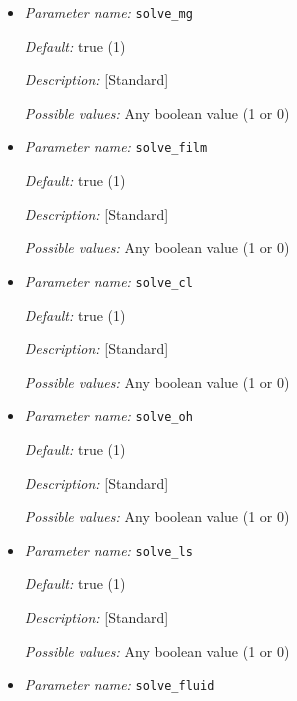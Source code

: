 \begin{itemize}
\item {\it Parameter name:} {\tt solve\_mg}
\label{parameters:solve_mg}


{\it Default:} true (1)

{\it Description:} [Standard] 

{\it Possible values:} Any boolean value (1 or 0)


\item {\it Parameter name:} {\tt solve\_film}
\label{parameters:solve_film}


{\it Default:} true (1)

{\it Description:} [Standard] 

{\it Possible values:} Any boolean value (1 or 0)


\item {\it Parameter name:} {\tt solve\_cl}
\label{parameters:solve_cl}


{\it Default:} true (1)

{\it Description:} [Standard] 

{\it Possible values:} Any boolean value (1 or 0)


\item {\it Parameter name:} {\tt solve\_oh}
\label{parameters:solve_oh}


{\it Default:} true (1)

{\it Description:} [Standard] 

{\it Possible values:} Any boolean value (1 or 0)


\item {\it Parameter name:} {\tt solve\_ls}
\label{parameters:solve_ls}


{\it Default:} true (1)

{\it Description:} [Standard] 

{\it Possible values:} Any boolean value (1 or 0)


\item {\it Parameter name:} {\tt solve\_fluid}
\label{parameters:solve_fluid}


\end{itemize}
